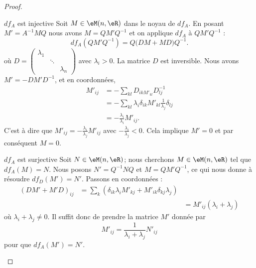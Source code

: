 \begin{proof}
    \begin{subproof}
        \item[\( df_A\) est injective]
            Soit \( M\in \eM(n,\eR)\) dans le noyau de \( df_A\). En posant \( M'=A^{-1}MQ\) nous avons \( M=QM'Q^{-1}\) et on applique \( df_A\) à \( QM'Q^{-1}\) :
            \begin{equation}
                df_A(QM'Q^{-1})=Q\big( DM+MD \big)Q^{-1}.
            \end{equation}
            où \( D=\begin{pmatrix}
                \lambda_1    &       &       \\
                    &   \ddots    &       \\
                    &       &   \lambda_n
                \end{pmatrix}\) avec \( \lambda_i>0\). La matrice \( D\) est inversible. Nous avons \( M'=-DM'D^{-1}\), et en coordonnées,
                \begin{subequations}
                    \begin{align}
                        M'_{ij}&=-\sum_{kl}D_{ikM'_{kl}}D^{-1}_{lj}\\
                        &=-\sum_{kl}\lambda_i\delta_{ik}M'_{kl}\frac{1}{ \lambda_j }\delta_{lj}\\
                        &=-\frac{ \lambda_i }{ \lambda_i }M'_{ij}.
                    \end{align}
                \end{subequations}
                C'est à dire que \( M'_{ij}=-\frac{ \lambda_i }{ \lambda_j }M'_{ij}\) avec \( -\frac{ \lambda_i }{ \lambda_j }<0\). Cela implique \( M'=0\) et par conséquent \( M=0\).
            \item[\( df_A\) est surjective]
                Soit \( N\in \eM(n,\eR)\); nous cherchons \( M\in \eM(n,\eR)\) tel que \( df_A(M)=N\). Nous posons \( N'=Q^{-1} NQ\) et \( M=QM'Q^{-1}\), ce qui nous donne à résoudre \( df_D(M')=N'\). Passons en coordonnées :
                \begin{subequations}
                    \begin{align}
                        (DM'+M'D)_{ij}&=\sum_k(\delta_{ik}\lambda_iM'_{kj}+M'_{ik}\delta_{kj}\lambda_j)\\&
                        &=M'_{ij}(\lambda_i+\lambda_j)
                    \end{align}
                \end{subequations}
                où \( \lambda_i+\lambda_j\neq 0\). Il suffit donc de prendre la matrice \( M'\) donnée par
                \begin{equation}
                    M'_{ij}=\frac{1}{ \lambda_i+\lambda_j }N'_{ij}
                \end{equation}
                pour que \( df_A(M')=N'\).
    \end{subproof}
    

\end{proof}
